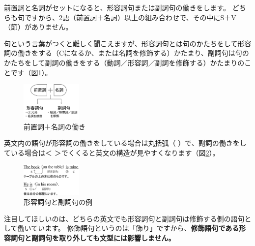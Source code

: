\documentclass[titlepage]{jsarticle}
\begin{document}
 前置詞と名詞がセットになると、形容詞句または副詞句の働きをします。
 どちらも句ですから、2語（前置詞＋名詞）以上の組み合わせで、その中にS＋V（節）がありません。

 句という言葉がつくと難しく聞こえますが、形容詞句とは句のかたちをして形容詞の働きをする（Cになるか、または名詞を修飾する）かたまり、副詞句は句のかたちをして副詞の働きをする（動詞／形容詞／副詞を修飾する）かたまりのことです（図\ref{fig14}）。
  \begin{figure}[htbp]
   \begin{center}
    \includegraphics[width=3cm]{./figure/fig14.pdf}
    \caption{前置詞＋名詞の働き}
    \label{fig14}
   \end{center}
  \end{figure}

  英文内の語句が形容詞の働きをしている場合は丸括弧（ ）で、副詞の働きをしている場合は＜ ＞でくくると英文の構造が見やすくなります（図\ref{fig15}）。
  \begin{figure}[htbp]
   \begin{center}
    \includegraphics[width=3cm]{./figure/fig15.pdf}
    \caption{形容詞句と副詞句の例}
    \label{fig15}
   \end{center}
  \end{figure}

  注目してほしいのは、どちらの英文でも形容詞句と副詞句は修飾する側の語句として働いています。
  修飾語句というのは「飾り」ですから、{\bf 修飾語句である形容詞句と副詞句を取り外しても文型には影響しません。}

  \newpage
\end{document}
